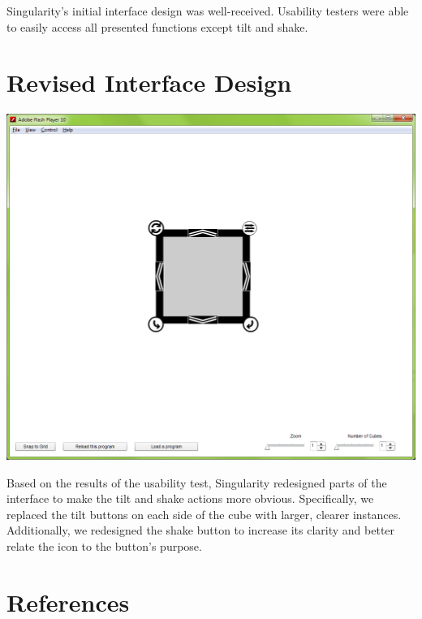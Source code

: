 \documentclass[12pt]{article}
\begin{document}
Singularity's initial interface design was well-received. Usability testers were able to easily access all presented functions except tilt and shake.

\section{Revised Interface Design}
\begin{center}
  \includegraphics[scale=.4]{../prototype/prototype2.png}
\end{center}

Based on the results of the usability test, Singularity redesigned parts of the interface to make the tilt and shake actions more obvious. Specifically, we replaced the tilt buttons on each side of the cube with larger, clearer instances. Additionally, we redesigned the shake button to increase its clarity and better relate the icon to the button's purpose.

\clearpage
{}
\printglossaries
\clearpage

\section*{References}
\end{document}
